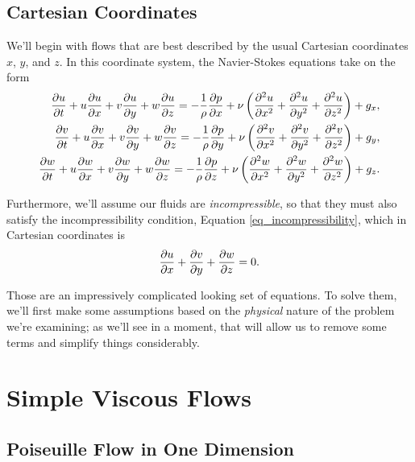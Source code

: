 
\subsection{Cartesian Coordinates}

We'll begin with flows that are best described by the usual Cartesian coordinates $x$, $y$, and $z$.  In this coordinate system, the Navier-Stokes equations take on the form
\begin{align}
\label{eq_ns_cart1}
\frac{\partial {u}}{\partial {t}} + u\frac{\partial {u}}{\partial {x}} + v \frac{\partial {u}}{\partial {y}} + w \frac{\partial {u}}{\partial {z}} = -\frac{1}{\rho} \frac{\partial {p}}{\partial {x}} + \nu \left( \frac{\partial^2 {u}}{\partial {x}^2} + \frac{\partial^2 {u}}{\partial {y}^2} + \frac{\partial^2 {u}}{\partial {z}^2} \right) + g_x, \\
\frac{\partial {v}}{\partial {t}} + u\frac{\partial {v}}{\partial {x}} + v \frac{\partial {v}}{\partial {y}} + w \frac{\partial {v}}{\partial {z}} = -\frac{1}{\rho} \frac{\partial {p}}{\partial {y}} + \nu \left( \frac{\partial^2 {v}}{\partial {x}^2} + \frac{\partial^2 {v}}{\partial {y}^2} + \frac{\partial^2 {v}}{\partial {z}^2} \right) + g_y, \\
\frac{\partial {w}}{\partial {t}} + u\frac{\partial {w}}{\partial {x}} + v \frac{\partial {w}}{\partial {y}} + w \frac{\partial {w}}{\partial {z}} = -\frac{1}{\rho} \frac{\partial {p}}{\partial {z}} + \nu \left( \frac{\partial^2 {w}}{\partial {x}^2} + \frac{\partial^2 {w}}{\partial {y}^2} + \frac{\partial^2 {w}}{\partial {z}^2} \right) + g_z.
\end{align}

Furthermore, we'll assume our fluids are \emph{incompressible}, so that they must also satisfy the incompressibility condition, Equation \ref{eq_incompressibility}, which in Cartesian coordinates is
\begin{equation}
\label{eq_incomp_cart}
\frac{\partial {u}}{\partial {x}}  + \frac{\partial {v}}{\partial {y}} + \frac{\partial {w}}{\partial {z}} = 0.
\end{equation}

Those are an impressively complicated looking set of equations.  To solve them, we'll first make some assumptions based on the \emph{physical} nature of the problem we're examining; as we'll see in a moment, that will allow us to remove some terms and simplify things considerably.

%
% 

\section{Simple Viscous Flows}



\subsection{Poiseuille Flow in One Dimension}
\label{sec_poise_1d}

